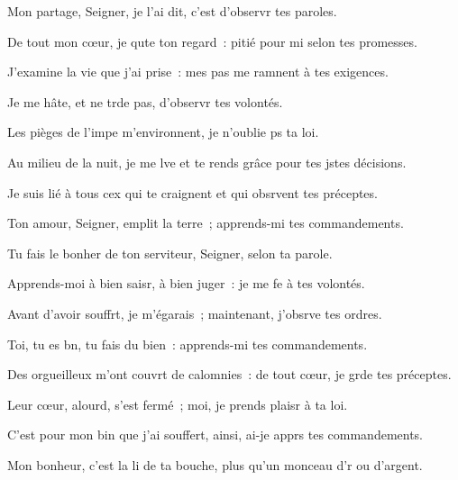 \item Mon partage, Seigner, je l’ai dit,\psstar{} c’est d’observr tes paroles.
\item De tout mon cœur, je qute ton regard :\psstar{} pitié pour mi selon tes promesses.
\item J’examine la vie que j’ai prise :\psstar{} mes pas me ramnent à tes exigences.
\item Je me hâte, et ne trde pas,\psstar{} d’observr tes volontés.
\item Les pièges de l’impe m’environnent,\psstar{} je n’oublie ps ta loi.
\item Au milieu de la nuit, je me lve et te rends grâce\psstar{} pour tes jstes décisions.
\item Je suis lié à tous cex qui te craignent\psstar{} et qui obsrvent tes préceptes.
\item Ton amour, Seigner, emplit la terre ;\psstar{} apprends-mi tes commandements.
\item Tu fais le bonher de ton serviteur,\psstar{} Seigner, selon ta parole.
\item Apprends-moi à bien saisr, à bien juger :\psstar{} je me fe à tes volontés.
\item Avant d’avoir souffrt, je m’égarais ;\psstar{} maintenant, j’obsrve tes ordres.
\item Toi, tu es bn, tu fais du bien :\psstar{} apprends-mi tes commandements.
\item Des orgueilleux m’ont couvrt de calomnies :\psstar{} de tout cœur, je grde tes préceptes.
\item Leur cœur, alourd, s’est fermé ;\psstar{} moi, je prends plaisr à ta loi.
\item C’est pour mon bin que j’ai souffert,\psstar{} ainsi, ai-je apprs tes commandements.
\item Mon bonheur, c’est la li de ta bouche,\psstar{} plus qu’un monceau d’r ou d’argent.